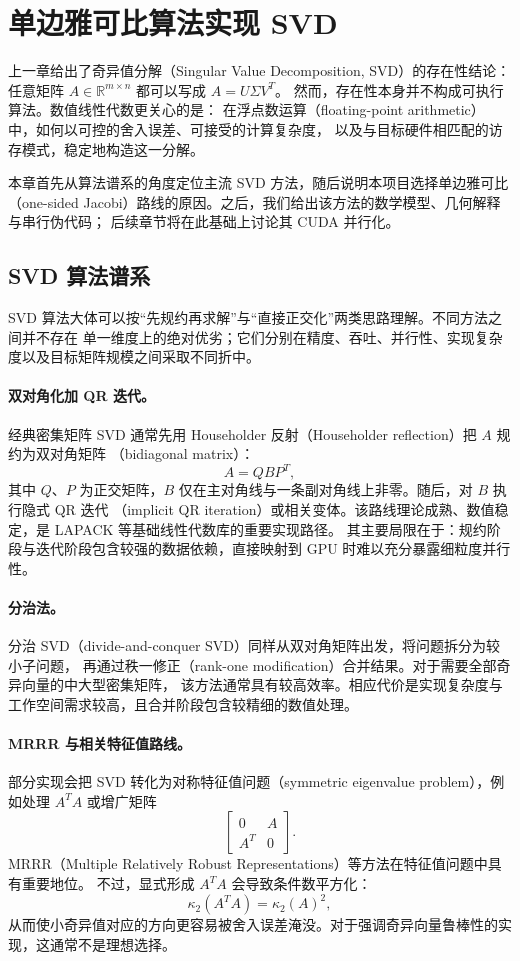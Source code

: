 \section{单边雅可比算法实现 SVD}

上一章给出了奇异值分解（Singular Value Decomposition, SVD）的存在性结论：
任意矩阵 $A\in\mathbb{R}^{m\times n}$ 都可以写成 $A=U\Sigma V^T$。
然而，存在性本身并不构成可执行算法。数值线性代数更关心的是：
在浮点数运算（floating-point arithmetic）中，如何以可控的舍入误差、可接受的计算复杂度，
以及与目标硬件相匹配的访存模式，稳定地构造这一分解。

本章首先从算法谱系的角度定位主流 SVD 方法，随后说明本项目选择单边雅可比
（one-sided Jacobi）路线的原因。之后，我们给出该方法的数学模型、几何解释与串行伪代码；
后续章节将在此基础上讨论其 CUDA 并行化。

\subsection{SVD 算法谱系}

SVD 算法大体可以按“先规约再求解”与“直接正交化”两类思路理解。不同方法之间并不存在
单一维度上的绝对优劣；它们分别在精度、吞吐、并行性、实现复杂度以及目标矩阵规模之间采取不同折中。

\paragraph{双对角化加 QR 迭代。}
经典密集矩阵 SVD 通常先用 Householder 反射（Householder reflection）把 $A$ 规约为双对角矩阵
（bidiagonal matrix）：
\[
    A = QBP^T,
\]
其中 $Q$、$P$ 为正交矩阵，$B$ 仅在主对角线与一条副对角线上非零。随后，对 $B$ 执行隐式 QR 迭代
（implicit QR iteration）或相关变体。该路线理论成熟、数值稳定，是 LAPACK 等基础线性代数库的重要实现路径。
其主要局限在于：规约阶段与迭代阶段包含较强的数据依赖，直接映射到 GPU 时难以充分暴露细粒度并行性。

\paragraph{分治法。}
分治 SVD（divide-and-conquer SVD）同样从双对角矩阵出发，将问题拆分为较小子问题，
再通过秩一修正（rank-one modification）合并结果。对于需要全部奇异向量的中大型密集矩阵，
该方法通常具有较高效率。相应代价是实现复杂度与工作空间需求较高，且合并阶段包含较精细的数值处理。

\paragraph{MRRR 与相关特征值路线。}
部分实现会把 SVD 转化为对称特征值问题（symmetric eigenvalue problem），例如处理
$A^TA$ 或增广矩阵
\[
    \begin{bmatrix}
        0   & A \\
        A^T & 0
    \end{bmatrix}.
\]
MRRR（Multiple Relatively Robust Representations）等方法在特征值问题中具有重要地位。
不过，显式形成 $A^TA$ 会导致条件数平方化：
\[
    \kappa_2(A^TA)=\kappa_2(A)^2,
\]
从而使小奇异值对应的方向更容易被舍入误差淹没。对于强调奇异向量鲁棒性的实现，这通常不是理想选择。

